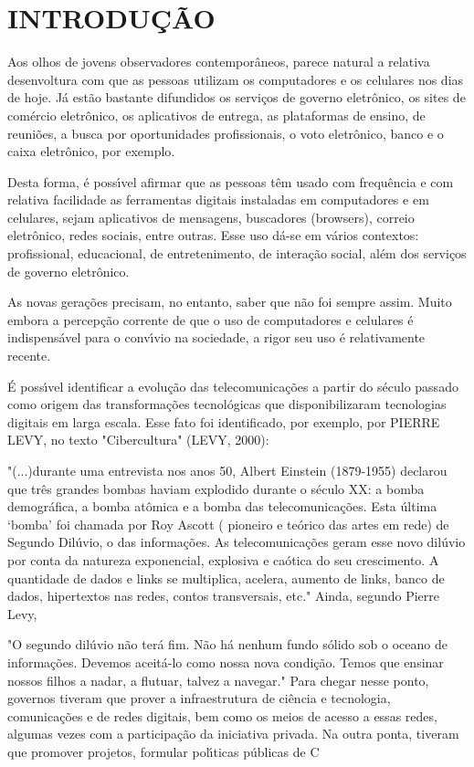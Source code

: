 \documentclass[
12pt,		%
openright,	%
twoside,  %
a4paper,			%
chapter=TITLE,		%
english,			%
french,				%
spanish,			%
brazil				%
]{USPSC-classe/USPSC}
\begin{document}
\chapter[INTRODU\c{C}\~AO]{INTRODU\c{C}\~AO}\label{INTRODU\c{C}\~AO}
Aos olhos de jovens observadores contempor\^aneos, parece natural a relativa desenvoltura com que as pessoas utilizam os computadores e os celulares nos dias de hoje. J\'a est\~ao bastante difundidos os servi\c{c}os de governo eletr\^onico, os sites de com\'ercio eletr\^onico, os  aplicativos de entrega, as plataformas de ensino, de reuni\~oes, a busca por oportunidades profissionais, o voto eletr\^onico, banco e o caixa eletr\^onico, por exemplo.


Desta forma, \'e poss\'{\i}vel afirmar que as pessoas t\^em usado com frequ\^encia e com relativa facilidade as ferramentas digitais instaladas em computadores e em celulares, sejam aplicativos de mensagens, buscadores (browsers), correio eletr\^onico, redes sociais, entre outras. Esse uso d\'a-se em v\'arios contextos: profissional, educacional, de entretenimento, de intera\c{c}\~ao social, al\'em dos servi\c{c}os de governo eletr\^onico.


As novas gera\c{c}\~oes precisam, no entanto, saber que n\~ao foi sempre assim. Muito embora a percep\c{c}\~ao corrente de que o uso de computadores e celulares \'e indispens\'avel para o conv\'{\i}vio na sociedade, a rigor seu uso \'e relativamente recente.


\'E poss\'{\i}vel identificar a evolu\c{c}\~ao das telecomunica\c{c}\~oes a partir do s\'eculo passado como origem das transforma\c{c}\~oes tecnol\'ogicas que disponibilizaram tecnologias digitais em larga escala. Esse fato foi identificado, por exemplo, por PIERRE LEVY, no texto "Cibercultura" (LEVY, 2000):


"(...)durante uma entrevista nos anos 50, Albert Einstein (1879-1955) declarou que tr\^es grandes bombas haviam  explodido durante o s\'eculo XX: a bomba demogr\'afica, a bomba at\^omica e a bomba das telecomunica\c{c}\~oes. Esta \'ultima ‘bomba’ foi chamada por Roy Ascott ( pioneiro e te\'orico das artes em rede) de Segundo Dil\'uvio, o das informa\c{c}\~oes. As telecomunica\c{c}\~oes geram esse novo dil\'uvio por conta da natureza exponencial, explosiva e ca\'otica do seu crescimento. A quantidade de dados e links se multiplica, acelera, aumento de links, banco de dados, hipertextos nas redes, contos transversais, etc."
Ainda, segundo Pierre Levy,


"O segundo dil\'uvio n\~ao ter\'a fim. N\~ao h\'a nenhum fundo s\'olido sob o oceano de informa\c{c}\~oes. Devemos aceit\'a-lo como nossa nova condi\c{c}\~ao. Temos que ensinar nossos filhos a nadar, a flutuar, talvez a navegar."
Para chegar nesse ponto, governos tiveram que prover a infraestrutura de ci\^encia e tecnologia, comunica\c{c}\~oes e de redes digitais, bem como os meios de acesso a essas redes, algumas vezes com a participa\c{c}\~ao da iniciativa privada. Na outra ponta, tiveram que promover projetos, formular pol\'{\i}ticas p\'ublicas de C
\end{document}
